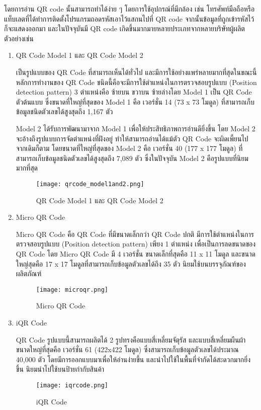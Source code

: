 โดยการอ่าน QR code นั้นสามารถทำได้ง่าย ๆ โดยการใช้อุปกรณ์ที่มีกล้อง เช่น โทรศัพท์มือถือหรือแท็บเลตที่ได้ทำการติดตั้งโปรแกรมถอดรหัสเอาไว้แสกนไปที่ QR code จากนั้นข้อมูลที่ถูกเข้ารหัสไว้ก็จะแสดงออกมา และในปัจจุบันมี QR code เกิดขึ้นมากมายหลายประเภทจากหลายบริษัทผู้ผลิต ตัวอย่างเช่น
\begin{enumerate}[listparindent=1.25em]
    \item QR Code Model 1 และ QR Code Model 2

    เป็นรูปแบบของ QR Code ที่สามารถเห็นได้ทั่วไป และมีการใช้อย่างแพร่หลายมากที่สุดในขณะนี้ หลักการทำงานของ QR Code ชนิดนี้คือจะมีการใช้ตำแหน่งในการตรวจสอบรูปแบบ (Position detection pattern) 3 ตำแหน่งคือ ซ้ายบน ขวาบน ซ้ายล่างโดย Model 1 เป็น QR Code ตัวต้นแบบ ซึ่งขนาดที่ใหญ่ที่สุดของ Model 1 คือ เวอร์ชั่น 14 (73 x 73 โมดูล) ที่สามารถเก็บข้อมูลชนิดตัวเลขได้สูงสุดถึง 1,167 ตัว 

    Model 2 ได้รับการพัฒนามาจาก Model 1 เพื่อให้ประสิทธิภาพการอ่านดียิ่งขึ้น โดย Model 2 จะอ้างถึงรูปแบบการจัดตำแหน่งที่ฝังอยู่ ทำให้สามารถอ่านได้แม้ตัว QR Code จะผิดเพี้ยนไปจากเดิมก็ตาม โดยขนาดที่ใหญ่ที่สุดของ Model 2 คือ เวอร์ชั่น 40 (177 x 177 โมดูล) ที่สามารถเก็บข้อมูลชนิดตัวเลขได้สูงสุดถึง 7,089 ตัว ซึ่งในปัจจุบัน Model 2 คือรูปแบบที่นิยมมากที่สุด
    \begin{figure}[ht]
        \centering
        \texttt{[image: qrcode\_model1and2.png]}
        \caption{QR Code Model 1 และ QR Code Model 2}
        \label{fig:qrcode_model1and2}
    \end{figure}

    \item Micro QR Code

    Micro QR Code คือ QR Code ที่มีขนาดเล็กกว่า QR Code ปกติ มีการใช้ตำแหน่งในการตรวจสอบรูปแบบ (Position detection pattern) เพียง 1 ตำแหน่ง เพื่อเป็นการลดขนาดของ QR Code โดย Micro QR Code มี 4 เวอร์ชั่น ขนาดเล็กที่สุดคือ 11 x 11 โมดูล และขนาดใหญ่สุดคือ 17 x 17 โมดูลที่สามารถเก็บข้อมูลตัวเลขได้ถึง 35 ตัว นิยมใช้บนบรรจุภัณฑ์ของผลิตภัณฑ์
    \begin{figure}[ht]
        \centering
        \texttt{[image: microqr.png]}
        \caption{Micro QR Code}
        \label{fig:microqr}
    \end{figure}

    \item iQR Code

    QR Code รูปแบบนี้สามารถผลิตได้ 2 รูปทรงคือแบบสี่เหลี่ยมจัตุรัส และแบบสี่เหลี่ยมผืนผ้า ขนาดใหญ่ที่สุดคือ เวอร์ชั่น 61 (422x422 โมดูล) ซึ่งสามารถเก็บข้อมูลตัวเลขได้ประมาณ 40,000 ตัว โดยมีการออกแบบมาเพื่อให้อ่านง่ายขึ้น และนำไปใช้ในพื้นที่จำกัดได้สะดวกมากยิ่งขึ้น นิยมนำไปใช้บนป้ายกำกับสินค้า
    \begin{figure}[ht]
        \centering
        \texttt{[image: iqrcode.png]}
        \caption{iQR Code}
        \label{fig:iqrcode}
    \end{figure}


\end{enumerate}
